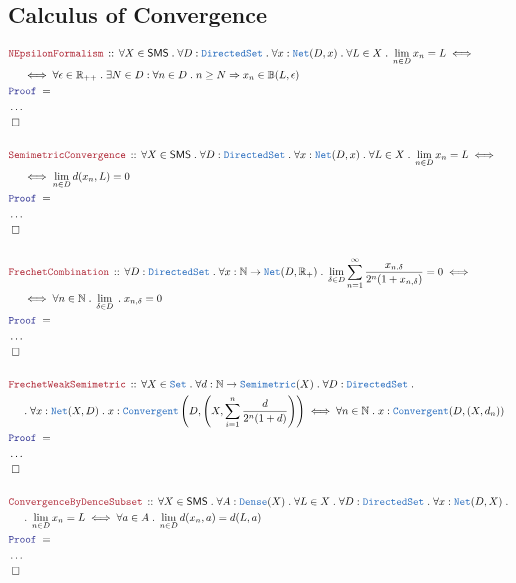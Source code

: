 \documentclass[12pt]{scrartcl}
\newcommand{\TYPE}[1]{\textcolor{NavyBlue}{\mathtt{#1}}}
\newcommand{\LOGIC}[1]{\textcolor{Blue}{\mathtt{#1}}}
\newcommand{\THM}[1]{\textcolor{Maroon}{\mathtt{#1}}}
\renewcommand{\.}{\; . \;}
\newcommand{\Theorem}[2]{& \THM{#1} \, :: \, #2 \\ & \Proof = \\ }
\newcommand{\NewLine}{\\ & \kern 1pc}
\newcommand{\Page}[1]{ \begin{align*} #1 \end{align*}   }
\newcommand{\NoProof}{ & \ldots \\ \EndProof}
\newcommand{\Imply}{\Rightarrow}
\newcommand{\Reals}{\mathbb{R} }
\newcommand{\Nat}{\mathbb{N} }
\newcommand{\Set}{\TYPE{Set}}
\newcommand{\QED}{\; \square}
\newcommand{\EndProof}{& \QED \\}
\newcommand{\Proof}{\LOGIC{Proof} \; }
\newcommand{\SMS}{\mathsf{SMS}}
\begin{document}
\subsection{Calculus of Convergence}
\Page{
	\Theorem{NEpsilonFormalism}
	{
		\forall X \in \SMS \. \forall D : \TYPE{DirectedSet} \. \forall  x : \TYPE{Net}(D,x) \. \forall L \in X  \.
		\lim_{n \in D} x_n = L \iff \NewLine \iff \forall \epsilon \in \Reals_{++} \. \exists N \in D : \forall n \in D \. 
		n \ge N \Imply  x_n \in \mathbb{B}(L,\epsilon)
	}
	\NoProof
	\\
	\Theorem{SemimetricConvergence}
	{
		\forall X \in \SMS \. \forall D : \TYPE{DirectedSet} \. \forall x : \TYPE{Net}(D,x) \. \forall L \in X \.
		\lim_{n \in D} x_n = L  \iff \NewLine \iff \lim_{n \in D} d(x_n,L) = 0 
	}
	\NoProof
	\\
	\Theorem{FrechetCombination}
	{
	  	\forall  D : \TYPE{DirectedSet} \. \forall x : \Nat \to \TYPE{Net}(D,\Reals_+) \. 
		\lim_{\delta \in D} \sum^\infty_{n=1} \frac{x_{n.\delta}}{2^n(1 + x_{n,\delta})} = 0 \iff \NewLine \iff \forall  n \in \Nat \. \lim_{\delta \in D} \. x_{n,\delta} = 0		  	
	}
	\NoProof
	\\
	\Theorem{FrechetWeakSemimetric}
	{
		\forall X \in \Set \. \forall d : \Nat \to \TYPE{Semimetric}(X) \. \forall D : \TYPE{DirectedSet} \.  \NewLine \. \forall x : \TYPE{Net}(X,D) \.
		x : \TYPE{Convergent}\left(D,\left(X, \sum^n_{i=1} \frac{d}{2^n(1 + d)}\right)\right) \iff \forall n \in \Nat \. x : \TYPE{Convergent}(D,(X,d_n))
	}
	\NoProof
	\\
	\Theorem{ConvergenceByDenceSubset}
	{
		\forall X \in \SMS \. \forall A : \TYPE{Dense}(X) \. \forall L \in X \.  \forall D : \TYPE{DirectedSet} \. 
		\forall x  : \TYPE{Net}(D,X) \. \NewLine \. \lim_{n \in D} x_n = L \iff \forall a \in A \. \lim_{n \in D} d(x_n,a) = d(L,a)
	}
	\NoProof
}
\newpage
\end{document}
